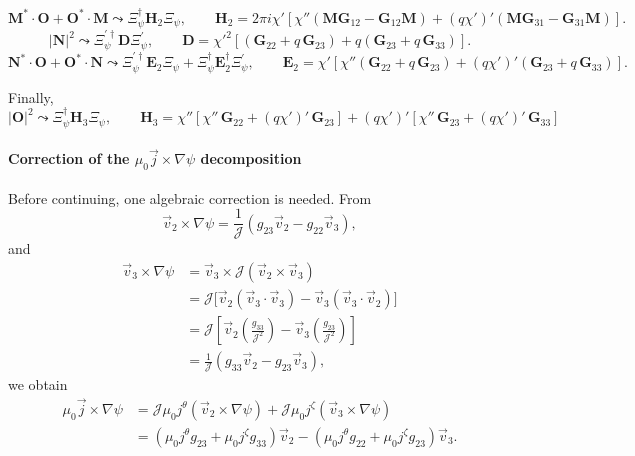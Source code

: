 \documentclass[10pt,a4paper]{article}
\numberwithin{equation}{section}
\begin{document}
\begin{equation}
\mathbf M^* \cdot \mathbf O + \mathbf O^* \cdot \mathbf M
\leadsto
\Xi_\psi^\dagger \mathbf H_2 \Xi_\psi,
\qquad
\mathbf H_2=2\pi i\chi'\left[\chi''(\mathbf M \mathbf G_{12}-\mathbf G_{12}\mathbf M)+(q\chi')'(\mathbf M \mathbf G_{31}-\mathbf G_{31}\mathbf M)\right].
\end{equation}
\begin{equation}
|\mathbf N|^2 \leadsto \Xi_\psi^{\prime\dagger} \mathbf D \Xi_\psi^\prime,
\qquad
\mathbf D=\chi'^2\left[(\mathbf{G}_{22}+q\,\mathbf{G}_{23})+q(\mathbf{G}_{23}+q\,\mathbf{G}_{33})\right].
\end{equation}
\begin{equation}
\mathbf N^* \cdot \mathbf O + \mathbf O^* \cdot \mathbf N
\leadsto
\Xi_\psi^{\prime\dagger}\mathbf E_2 \Xi_\psi + \Xi_\psi^\dagger \mathbf E_2^\dagger \Xi_\psi^\prime,
\qquad
\mathbf E_2=\chi'\left[\chi''(\mathbf{G}_{22}+q\,\mathbf{G}_{23})+(q\chi')'(\mathbf{G}_{23}+q\,\mathbf{G}_{33})\right].
\end{equation}

Finally,
\begin{equation}
|\mathbf O|^2 \leadsto \Xi_\psi^\dagger \mathbf H_3 \Xi_\psi,
\qquad
\mathbf{H}_3
=
\chi''
\left[
\chi''\,\mathbf{G}_{22}
+
(q\chi')'\,\mathbf{G}_{23}
\right]
+
(q\chi')'
\left[
\chi''\,\mathbf{G}_{23}
+
(q\chi')'\,\mathbf{G}_{33}
\right]
\end{equation}

\paragraph{Correction of the $\mu_0\vec j\times\nabla\psi$ decomposition}

Before continuing, one algebraic correction is needed.
From
\begin{equation}
\vec v_2 \times \nabla\psi
=
\frac{1}{\mathcal J}(g_{23}\vec v_2-g_{22}\vec v_3),
\end{equation}
and
\begin{align}
\vec v_3 \times \nabla\psi
&=
\vec v_3\times \mathcal J(\vec v_2\times \vec v_3) \\
&=
\mathcal J\big[\vec v_2(\vec v_3\cdot \vec v_3)-\vec v_3(\vec v_3\cdot \vec v_2)\big] \\
&=
\mathcal J\left[
\vec v_2\left(\frac{g_{33}}{\mathcal J^2}\right)
-
\vec v_3\left(\frac{g_{23}}{\mathcal J^2}\right)
\right] \\
&=
\frac{1}{\mathcal J}(g_{33}\vec v_2-g_{23}\vec v_3),
\end{align}
we obtain
\begin{align}
\mu_0\vec j\times \nabla\psi
&=
\mathcal J\mu_0j^\theta(\vec v_2\times \nabla\psi)
+\mathcal J\mu_0j^\zeta(\vec v_3\times \nabla\psi) \\
&=
(\mu_0j^\theta g_{23}+\mu_0j^\zeta g_{33})\vec v_2
-
(\mu_0j^\theta g_{22}+\mu_0j^\zeta g_{23})\vec v_3.
\end{align}
\end{document}
